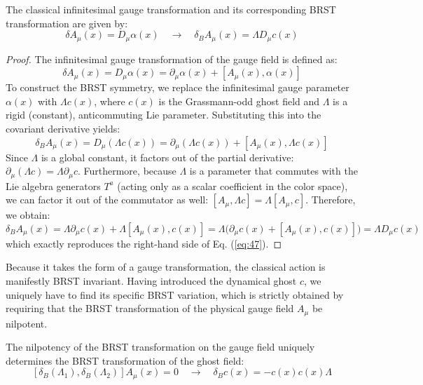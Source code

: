 The classical infinitesimal gauge transformation and its corresponding BRST transformation are given by:
\begin{equation} \label{eq:47}
    \delta A_\mu(x) = D_\mu \alpha(x) \quad \rightarrow \quad \delta_B A_\mu(x) = \Lambda D_\mu c(x)
\end{equation}

\begin{proof}
    The infinitesimal gauge transformation of the gauge field is defined as:
    \[
        \delta A_\mu(x) = D_\mu \alpha(x) = \partial_\mu \alpha(x) + [A_\mu(x), \alpha(x)]
    \]
    To construct the BRST symmetry, we replace the infinitesimal gauge parameter \(\alpha(x)\) with \(\Lambda c(x)\), where \(c(x)\) is the Grassmann-odd ghost field and \(\Lambda\) is a rigid (constant), anticommuting Lie parameter. Substituting this into the covariant derivative yields:
    \[
        \delta_B A_\mu(x) = D_\mu (\Lambda c(x)) = \partial_\mu (\Lambda c(x)) + [A_\mu(x), \Lambda c(x)]
    \]
    Since \(\Lambda\) is a global constant, it factors out of the partial derivative: \(\partial_\mu (\Lambda c) = \Lambda \partial_\mu c\). Furthermore, because \(\Lambda\) is a parameter that commutes with the Lie algebra generators \(T^a\) (acting only as a scalar coefficient in the color space), we can factor it out of the commutator as well: \([A_\mu, \Lambda c] = \Lambda [A_\mu, c]\). Therefore, we obtain:
    \[
        \delta_B A_\mu(x) = \Lambda \partial_\mu c(x) + \Lambda [A_\mu(x), c(x)] = \Lambda \big( \partial_\mu c(x) + [A_\mu(x), c(x)] \big) = \Lambda D_\mu c(x)
    \]
    which exactly reproduces the right-hand side of Eq. (\ref{eq:47}).
\end{proof}

Because it takes the form of a gauge transformation, the classical action is manifestly BRST invariant. Having introduced the dynamical ghost \(c\), we uniquely have to find its specific BRST variation, which is strictly obtained by requiring that the BRST transformation of the physical gauge field \(A_\mu\) be nilpotent.

The nilpotency of the BRST transformation on the gauge field uniquely determines the BRST transformation of the ghost field:
\begin{equation} \label{eq:48}
    [\delta_B(\Lambda_1), \delta_B(\Lambda_2)] A_\mu(x) = 0 \quad \rightarrow \quad \delta_B c(x) = -c(x)c(x)\Lambda
\end{equation}

